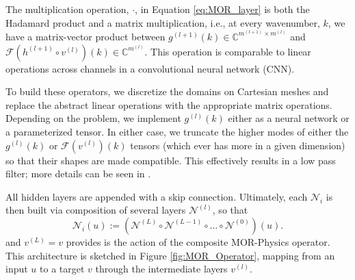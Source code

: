 The multiplication operation, $\cdot$, in Equation \eqref{eq:MOR_layer} is both the Hadamard product and a matrix multiplication, i.e., at every wavenumber, $k$, we have a matrix-vector product between \(g^{(l+1)}(k) \in \mathbb{C}^{m^{(l+1)} \times  m^{(l)}}\) and \(\mathcal{F}(h^{(l+1)} \circ v^{(l)})(k) \in \mathbb{C}^{m^{(l)}}\). This operation is comparable to linear operations across channels in a convolutional neural network (CNN).

To build these operators, we discretize the domains on Cartesian meshes and replace the abstract linear operations with the appropriate matrix operations. Depending on the problem, we implement \(g^{(l)}(k)\) either as a neural network or a parameterized tensor. In either case, we truncate the higher modes of either the \(g^{(l)}(k)\) or \(\mathcal{F}(v^{(l)})(k)\) tensors (which ever has more in a given dimension) so that their shapes are made compatible. This effectively results in a low pass filter; more details can be seen in \cite{patel2018MOR_Operator}.

All hidden layers are appended with a skip connection. Ultimately, each $\mathcal{N}_i$ is then built via composition of several layers $\mathcal{N}^{(l)}$, so that
$$\mathcal{N}_i(u) := (\mathcal{N}^{(L)} \circ \mathcal{N}^{(L-1)} \circ \dots \circ \mathcal{N}^{(0)})(u).$$
and $v^{(L)} = v$ provides is the action of the composite MOR-Physics operator.
This architecture is sketched in Figure \ref{fig:MOR_Operator}, mapping from an input $u$ to a target $v$ through the intermediate layers $v^{(l)}$.

